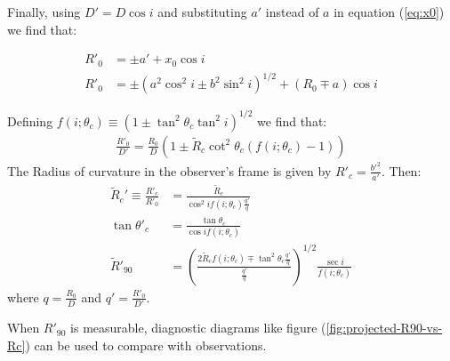 Finally, using $D' = D\cos i$ and substituting $a'$ instead of $a$ in equation (\ref{eq:x0}) we find that: 

\begin{align}
R'_0 &= \pm a' + x_0\cos i \\
R'_0 &= \pm\left(a^2\cos^2 i \pm b^2\sin^2 i\right)^{1/2} +  (R_0 \mp a)\cos i
\end{align}

Defining  $f(i;\theta_c)\equiv\left(1\pm\tan^2\theta_c\tan^2i\right)^{1/2}$ we find that:
\begin{align}
\frac{R'_0}{D'}=\frac{R_0}{D}\left(1\pm \tilde{R}_c\cot^2\theta_c(f(i;\theta_c)-1) \right)
\label{eq:qprime}
\end{align}
The Radius of curvature in the observer's frame is given by $R'_c=\frac{b'^2}{a'}$. Then:
\begin{align}
  \tilde{R}_c'\equiv  \frac{R'_c}{R'_0} &= \frac{\tilde{R}_c}{\cos^2 i f(i;\theta_c)\frac{q'}{q}}
  \label{eq:Aprime}\\
  \tan\theta'_c & = \frac{\tan\theta_c}{\cos i f(i;\theta_c)} \\
  \tilde{R}'_{90} &= \left(\frac{2\tilde{R}_cf(i;\theta_c) \mp \tan^2\theta_c\frac{q'}{q}}{\frac{q'}{q}}\right)^{1/2}\frac{\sec i}{f(i;\theta_c)}
\end{align}
where $q=\frac{R_0}{D}$ and $q' = \frac{R'_0}{D'}$.

When $R'_{90}$ is measurable, diagnostic diagrams like figure (\ref{fig:projected-R90-vs-Rc}) can be used to compare with observations.  



 

